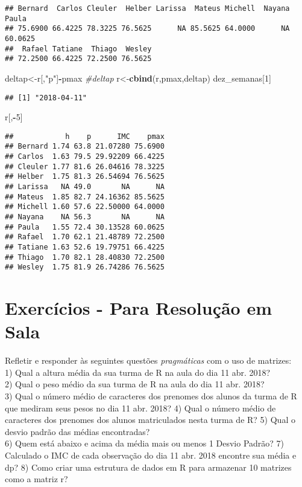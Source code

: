 \documentclass[]{article}
\newenvironment{Shaded}{\begin{snugshade}}{\end{snugshade}}
\newcommand{\KeywordTok}[1]{\textcolor[rgb]{0.13,0.29,0.53}{\textbf{#1}}}
\newcommand{\DecValTok}[1]{\textcolor[rgb]{0.00,0.00,0.81}{#1}}
\newcommand{\StringTok}[1]{\textcolor[rgb]{0.31,0.60,0.02}{#1}}
\newcommand{\CommentTok}[1]{\textcolor[rgb]{0.56,0.35,0.01}{\textit{#1}}}
\newcommand{\OperatorTok}[1]{\textcolor[rgb]{0.81,0.36,0.00}{\textbf{#1}}}
\newcommand{\NormalTok}[1]{#1}
\begin{document}
\begin{verbatim}
## Bernard  Carlos Cleuler  Helber Larissa  Mateus Michell  Nayana   Paula 
## 75.6900 66.4225 78.3225 76.5625      NA 85.5625 64.0000      NA 60.0625 
##  Rafael Tatiane  Thiago  Wesley 
## 72.2500 66.4225 72.2500 76.5625
\end{verbatim}

\begin{Shaded}
\begin{Highlighting}[]
\NormalTok{deltap<-r[,}\StringTok{"p"}\NormalTok{]}\OperatorTok{-}\NormalTok{pmax}
\CommentTok{#deltap}
\NormalTok{r<-}\KeywordTok{cbind}\NormalTok{(r,pmax,deltap)}
\NormalTok{dez_semanas[}\DecValTok{1}\NormalTok{]}
\end{Highlighting}
\end{Shaded}

\begin{verbatim}
## [1] "2018-04-11"
\end{verbatim}

\begin{Shaded}
\begin{Highlighting}[]
\NormalTok{r[,}\OperatorTok{-}\DecValTok{5}\NormalTok{]}
\end{Highlighting}
\end{Shaded}

\begin{verbatim}
##            h    p      IMC    pmax
## Bernard 1.74 63.8 21.07280 75.6900
## Carlos  1.63 79.5 29.92209 66.4225
## Cleuler 1.77 81.6 26.04616 78.3225
## Helber  1.75 81.3 26.54694 76.5625
## Larissa   NA 49.0       NA      NA
## Mateus  1.85 82.7 24.16362 85.5625
## Michell 1.60 57.6 22.50000 64.0000
## Nayana    NA 56.3       NA      NA
## Paula   1.55 72.4 30.13528 60.0625
## Rafael  1.70 62.1 21.48789 72.2500
## Tatiane 1.63 52.6 19.79751 66.4225
## Thiago  1.70 82.1 28.40830 72.2500
## Wesley  1.75 81.9 26.74286 76.5625
\end{verbatim}

\section{Exercícios - Para Resolução em
Sala}\label{exercicios---para-resolucao-em-sala}

Refletir e responder às seguintes questões \emph{pragmáticas} com o uso
de matrizes:\\
1) Qual a altura média da sua turma de R na aula do dia 11 abr. 2018?\\
2) Qual o peso médio da sua turma de R na aula do dia 11 abr. 2018?\\
3) Qual o número médio de caracteres dos prenomes dos alunos da turma de
R que mediram seus pesos no dia 11 abr. 2018? 4) Qual o número médio de
caracteres dos prenomes dos alunos matriculados nesta turma de R? 5)
Qual o desvio padrão das médias encontradas?\\
6) Quem está abaixo e acima da média mais ou menos 1 Desvio Padrão? 7)
Calculado o IMC de cada observação do dia 11 abr. 2018 encontre sua
média e dp? 8) Como criar uma estrutura de dados em R para armazenar 10
matrizes como a matriz r?
\end{document}
